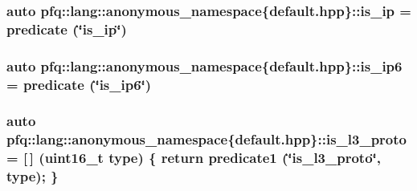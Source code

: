 \hypertarget{namespacepfq_1_1lang_1_1anonymous__namespace_02default_8hpp_03_aa97a34e12e4c6bc2d85a5c169800cfa4}{
\subsubsection[{is\+\_\+ip}]{\setlength{\rightskip}{0pt plus 5cm}auto pfq\+::lang\+::anonymous\+\_\+namespace\{default.\+hpp\}\+::is\+\_\+ip = {\bf predicate} (\char`\"{}is\+\_\+ip\char`\"{})}}\label{namespacepfq_1_1lang_1_1anonymous__namespace_02default_8hpp_03_aa97a34e12e4c6bc2d85a5c169800cfa4}
\hypertarget{namespacepfq_1_1lang_1_1anonymous__namespace_02default_8hpp_03_a5fa35e94e399b76838b7be894d85b83c}{
\subsubsection[{is\+\_\+ip6}]{\setlength{\rightskip}{0pt plus 5cm}auto pfq\+::lang\+::anonymous\+\_\+namespace\{default.\+hpp\}\+::is\+\_\+ip6 = {\bf predicate} (\char`\"{}is\+\_\+ip6\char`\"{})}}\label{namespacepfq_1_1lang_1_1anonymous__namespace_02default_8hpp_03_a5fa35e94e399b76838b7be894d85b83c}
\hypertarget{namespacepfq_1_1lang_1_1anonymous__namespace_02default_8hpp_03_a814bb9c3c833dc2af342d695b1d503e8}{
\subsubsection[{is\+\_\+l3\+\_\+proto}]{\setlength{\rightskip}{0pt plus 5cm}auto pfq\+::lang\+::anonymous\+\_\+namespace\{default.\+hpp\}\+::is\+\_\+l3\+\_\+proto = \mbox{[}$\,$\mbox{]} (uint16\+\_\+t type) \{ return {\bf predicate1} (\char`\"{}is\+\_\+l3\+\_\+proto\char`\"{}, type); \}}}\label{namespacepfq_1_1lang_1_1anonymous__namespace_02default_8hpp_03_a814bb9c3c833dc2af342d695b1d503e8}
